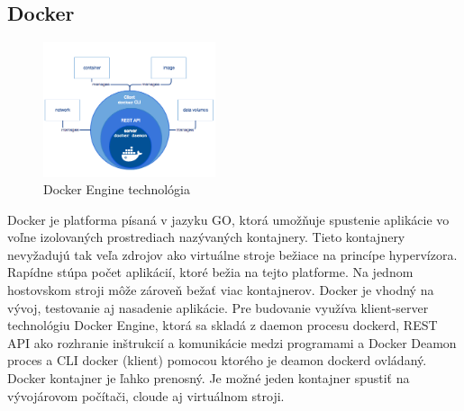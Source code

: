 \documentclass[../../main.tex]{subfiles}
\begin{document}
    
\subsection{Docker}

 \begin{figure}
    \centering
        \includegraphics[width=0.45\textwidth]{images/Docker_engine.png}
  \caption{Docker Engine technológia\cite{docker_overview}}
\end{figure}

 Docker je platforma písaná v jazyku GO, ktorá umožňuje spustenie aplikácie vo voľne izolovaných  prostrediach nazývaných kontajnery. Tieto kontajnery nevyžadujú tak veľa zdrojov ako virtuálne stroje bežiace na princípe hypervízora. Rapídne stúpa počet aplikácií, ktoré bežia na tejto platforme. Na jednom hostovskom stroji môže zároveň bežať viac kontajnerov. Docker je vhodný na vývoj, testovanie aj nasadenie aplikácie. Pre budovanie využíva klient-server technológiu Docker Engine, ktorá sa skladá z daemon procesu dockerd, REST API ako rozhranie  inštrukcií a komunikácie medzi programami a Docker Deamon proces a  CLI docker (klient) pomocou ktorého je deamon dockerd ovládaný. Docker kontajner je ľahko prenosný. Je možné jeden kontajner spustiť na vývojárovom počítači, cloude aj virtuálnom stroji.
\end{document}
